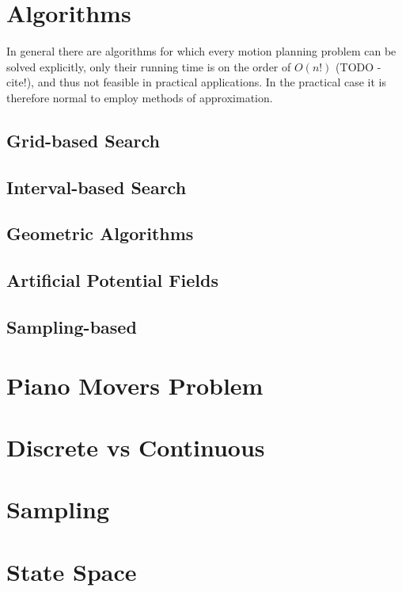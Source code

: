 \section{Algorithms}
In general there are algorithms for which every motion planning problem can be
solved explicitly, only their running time is on the order of \(O(n!)\) (TODO - cite!), and
thus not feasible in practical applications. In the practical case it is
therefore normal to employ methods of approximation.

\subsection{Grid-based Search}

\subsection{Interval-based Search}

\subsection{Geometric Algorithms}

\subsection{Artificial Potential Fields}

\subsection{Sampling-based}

\section{Piano Movers Problem}

\section{Discrete vs Continuous}

\section{Sampling}

\section{State Space}

